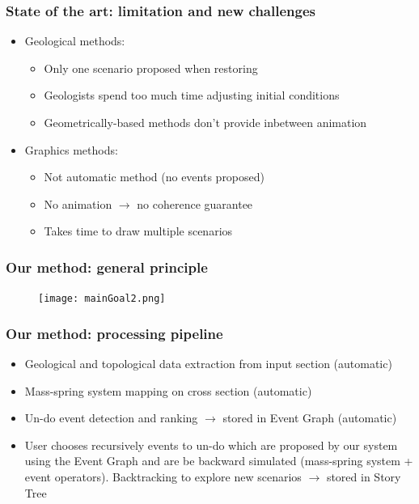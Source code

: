 \documentclass{beamer}
\begin{document}
	\begin{frame}
	\frametitle{State of the art: limitation and new challenges}
	\begin{itemize}
	\item Geological methods: 
		\begin{itemize}
		 \item Only one scenario proposed when restoring
		 \item Geologists spend too much time adjusting initial conditions
		 \item Geometrically-based methods don't provide inbetween animation
		\end{itemize}
	\item Graphics methods:
	\begin{itemize}
	\item Not automatic method (no events proposed)
	\item No animation $\longrightarrow$ no coherence guarantee
	\item Takes time to draw multiple scenarios
	\end{itemize}
	\end{itemize}
    \end{frame}	
    
    \begin{frame}
	\frametitle{Our method: general principle}
	 \begin{figure}[H]
	\centering
	\texttt{[image: mainGoal2.png]}
	\label{maingoal}
	\end{figure}
	\end{frame}
       
	\begin{frame}
	\frametitle{Our method: processing pipeline}
	\begin{itemize}
	\item Geological and topological data extraction from input section (automatic)
	\item Mass-spring system mapping on cross section (automatic)
	\item Un-do event detection and ranking $\rightarrow$ stored in Event Graph (automatic)
	\item User chooses recursively events to un-do which are proposed by our system using the Event Graph and are be backward simulated (mass-spring system + event operators). Backtracking to explore new scenarios $\rightarrow$ stored in Story Tree
	\end{itemize}
	\end{frame}	
	
\end{document}
